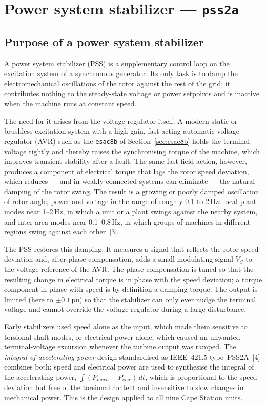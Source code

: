 \section{Power system stabilizer --- \texttt{pss2a}}
\label{sec:pss2a}

\subsection{Purpose of a power system stabilizer}

A power system stabilizer (PSS) is a supplementary control loop on the excitation
system of a synchronous generator. Its only task is to damp the electromechanical
oscillations of the rotor against the rest of the grid; it contributes nothing to
the steady-state voltage or power setpoints and is inactive when the machine runs
at constant speed.

The need for it arises from the voltage regulator itself. A modern static or
brushless excitation system with a high-gain, fast-acting automatic voltage
regulator (AVR) such as the \texttt{esac8b} of Section~\ref{sec:esac8b} holds the
terminal voltage tightly and thereby raises the synchronising torque of the machine,
which improves transient stability after a fault. The same fast field action,
however, produces a component of electrical torque that lags the rotor speed
deviation, which reduces --- and in weakly connected systems can eliminate --- the
natural damping of the rotor swing. The result is a growing or poorly damped
oscillation of rotor angle, power and voltage in the range of roughly 0.1 to 2\,Hz:
local plant modes near 1--2\,Hz, in which a unit or a plant swings against the
nearby system, and inter-area modes near 0.1--0.8\,Hz, in which groups of machines
in different regions swing against each other~[3].

The PSS restores this damping. It measures a signal that reflects the rotor speed
deviation and, after phase compensation, adds a small modulating signal $V_S$ to the
voltage reference of the AVR. The phase compensation is tuned so that the resulting
change in electrical torque is in phase with the speed deviation; a torque component
in phase with speed is by definition a damping torque. The output is limited (here to
$\pm0.1$\,pu) so that the stabilizer can only ever nudge the terminal voltage and
cannot override the voltage regulator during a large disturbance.

Early stabilizers used speed alone as the input, which made them sensitive to
torsional shaft modes, or electrical power alone, which caused an unwanted
terminal-voltage excursion whenever the turbine output was ramped. The
\emph{integral-of-accelerating-power} design standardised as IEEE~421.5
type~PSS2A~[4] combines both: speed and electrical power are used to synthesise the
integral of the accelerating power, $\int (P_{mech} - P_{elec})\,dt$, which is
proportional to the speed deviation but free of the torsional content and
insensitive to slow changes in mechanical power. This is the design applied to all
nine Cape Station units.

